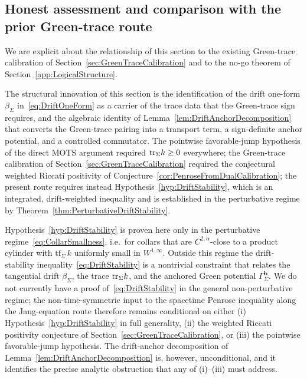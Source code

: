 \subsection{Honest assessment and comparison with the prior Green-trace route}

We are explicit about the relationship of this section to the existing Green-trace calibration of Section~\ref{sec:GreenTraceCalibration} and to the no-go theorem of Section~\ref{app:LogicalStructure}.

\begin{remark}\label{rem:DriftAnchorNew}
The structural innovation of this section is the identification of the drift one-form $\beta_\Sigma$ in~\eqref{eq:DriftOneForm} as a carrier of the trace data that the Green-trace sign requires, and the algebraic identity of Lemma~\ref{lem:DriftAnchorDecomposition} that converts the Green-trace pairing into a transport term, a sign-definite anchor potential, and a controlled commutator. The pointwise favorable-jump hypothesis of the direct MOTS argument required $\mathrm{tr}_\Sigma k\ge0$ everywhere; the Green-trace calibration of Section~\ref{sec:GreenTraceCalibration} required the conjectural weighted Riccati positivity of Conjecture~\ref{cor:PenroseFromDualCalibration}; the present route requires instead Hypothesis~\ref{hyp:DriftStability}, which is an integrated, drift-weighted inequality and is established in the perturbative regime by Theorem~\ref{thm:PerturbativeDriftStability}.
\end{remark}

\begin{remark}\label{rem:DriftAnchorOpen}
Hypothesis~\ref{hyp:DriftStability} is proven here only in the perturbative regime~\eqref{eq:CollarSmallness}, i.e.\ for collars that are $C^{2,\alpha}$-close to a product cylinder with $\mathrm{tf}_\Sigma\,k$ uniformly small in $W^{1,\infty}$. Outside this regime the drift-stability inequality~\eqref{eq:DriftStability} is a nontrivial constraint that relates the tangential drift $\beta_\Sigma$, the trace $\mathrm{tr}_\Sigma k$, and the anchored Green potential $\Gamma_\Sigma^{\mathbf b}$. We do not currently have a proof of~\eqref{eq:DriftStability} in the general non-perturbative regime; the non-time-symmetric input to the spacetime Penrose inequality along the Jang-equation route therefore remains conditional on either (i) Hypothesis~\ref{hyp:DriftStability} in full generality, (ii) the weighted Riccati positivity conjecture of Section~\ref{sec:GreenTraceCalibration}, or (iii) the pointwise favorable-jump hypothesis. The drift-anchor decomposition of Lemma~\ref{lem:DriftAnchorDecomposition} is, however, unconditional, and it identifies the precise analytic obstruction that any of (i)--(iii) must address.
\end{remark}

